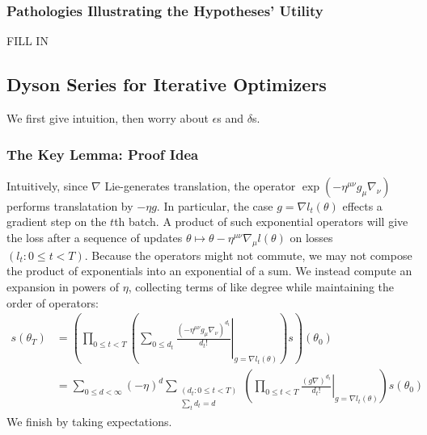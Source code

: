 \documentclass{article}
\theoremstyle{plain}
\theoremstyle{definition}
\newcommand{\wrap}[1]{\left(#1\right)}
\begin{document}
        \subsubsection*{Pathologies Illustrating the Hypotheses' Utility}
            {\color{moor} FILL IN}


    \subsection{Dyson Series for Iterative Optimizers}
        We first give intuition, then worry about $\epsilon$s and $\delta$s.
        \subsubsection*{The Key Lemma: Proof Idea}
            Intuitively, since $\nabla$ Lie-generates translation, the operator
            $
                \exp\wrap{
                    -\eta^{\mu\nu} g_\mu \nabla_\nu
                }
            $
            performs translatation by $-\eta g$.  In particular, the case
            $g=\nabla l_t(\theta)$ effects a gradient step on the $t$th batch.
            A product of such exponential operators will give the loss after a
            sequence of updates $\theta \mapsto \theta - \eta^{\mu\nu}
            \nabla_\mu l(\theta)$ on losses $(l_t: 0\leq t < T)$.  Because the
            operators might not commute, we may not compose the product of
            exponentials into an exponential of a sum.  We instead compute an
            expansion in powers of $\eta$, collecting terms of like degree
            while maintaining the order of operators:
            \begin{align*}
                s(\theta_T)
                &=
                \wrap{\prod_{0\leq t<T} \wrap{
                    \sum_{0\leq d_t}
                        \left.
                            \frac{(-\eta^{\mu\nu} g_\mu \nabla_\nu)^{d_t}}{d_t!}
                        \right|_{g=\nabla l_t(\theta)}
                }
                s} (\theta_0) \\
                &= 
                \sum_{0\leq d < \infty} (-\eta)^d
                \sum_{\substack{(d_t: 0\leq t<T) \\ \sum_t d_t = d}}
                \wrap{
                    \prod_{0 \leq t < T} \left.
                        \frac{(g \nabla)^{d_t}}{d_t!}
                    \right|_{g=\nabla l_t(\theta)}
                } s (\theta_0)
            \end{align*}
            We finish by taking expectations.
\end{document}
